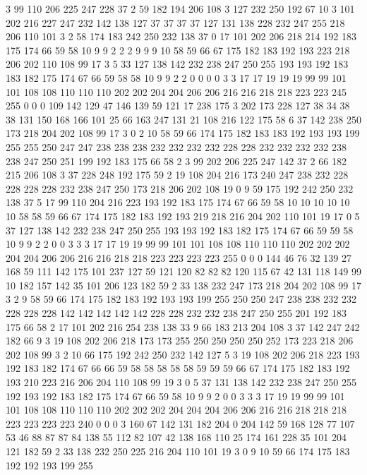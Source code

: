 3 99 110 206 225 247 228 37 2 59 182 194 206 108 3 127 232 250 192 67
10 3 101 202 216 227 247 232 142 138 127 37 37 37 37 127 131 138 228 232
247 255 218 206 110 101 3 2 58 174 183 242 250 232 138 37 0 17 101 202
206 218 214 192 183 175 174 66 59 58 10 9 9 2 2 2 9 9 9 10
58 59 66 67 175 182 183 192 193 223 218 206 202 110 108 99 17 3 5 33
127 138 142 232 238 247 250 255 193 193 192 183 183 182 175 174 67 66 59 58
58 10 9 9 2 2 0 0 0 0 3 3 17 17 19 19 19 99 99 101
101 108 108 110 110 110 202 202 204 204 206 206 216 216 218 218 223 223 245 255
0 0 0 109 142 129 47 146 139 59 121 17 238 175 3 202 173 228 127 38
34 38 38 131 150 168 166 101 25 66 163 247 131 21 108 216 122 175 58 6
37 142 238 250 173 218 204 202 108 99 17 3 0 2 10 58 59 66 174 175
182 183 183 192 193 193 199 255 255 250 247 247 238 238 238 232 232 232 232 228
228 232 232 232 232 238 238 247 250 251 199 192 183 175 66 58 2 3 99 202
206 225 247 142 37 2 66 182 215 206 108 3 37 228 248 192 175 59 2 19
108 204 216 173 240 247 238 232 228 228 228 228 232 238 247 250 173 218 206 202
108 19 0 9 59 175 192 242 250 232 138 37 5 17 99 110 204 216 223 193
192 183 175 174 67 66 59 58 10 10 10 10 10 10 58 58 59 66 67 174
175 182 183 192 193 219 218 216 204 202 110 101 19 17 0 5 37 127 138 142
232 238 247 250 255 193 193 192 183 182 175 174 67 66 59 59 58 10 9 9
2 2 0 0 3 3 3 17 17 19 19 99 99 101 101 108 108 110 110 110
202 202 202 204 204 206 206 216 216 218 218 223 223 223 223 255 0 0 0 144
46 76 32 139 27 168 59 111 142 175 101 237 127 59 121 120 82 82 82 120
115 67 42 131 118 149 99 10 182 157 142 35 101 206 123 182 59 2 33 138
232 247 173 218 204 202 108 99 17 3 2 9 58 59 66 174 175 182 183 192
193 193 199 255 250 250 247 238 238 232 232 228 228 228 142 142 142 142 142 228
228 232 232 238 247 250 255 201 192 183 175 66 58 2 17 101 202 216 254 238
138 33 9 66 183 213 204 108 3 37 142 247 242 182 66 9 3 19 108 202
206 218 173 173 255 250 250 250 250 252 173 223 218 206 202 108 99 3 2 10
66 175 192 242 250 232 142 127 5 3 19 108 202 206 218 223 193 192 183 182
174 67 66 66 59 58 58 58 58 58 59 59 59 66 67 174 175 182 183 192
193 210 223 216 206 204 110 108 99 19 3 0 5 37 131 138 142 232 238 247
250 255 192 193 192 183 182 175 174 67 66 59 58 10 9 9 2 0 0 3
3 3 17 19 19 99 99 101 101 108 108 110 110 110 202 202 202 204 204 204
206 206 216 216 218 218 218 223 223 223 223 240 0 0 0 3 160 67 142 131
182 204 0 204 142 59 168 128 77 107 53 46 88 87 87 84 138 55 112 82
107 42 138 168 110 25 174 161 228 35 101 204 121 182 59 2 33 138 232 250
225 216 204 110 101 19 3 0 9 10 59 66 174 175 183 192 192 193 199 255

